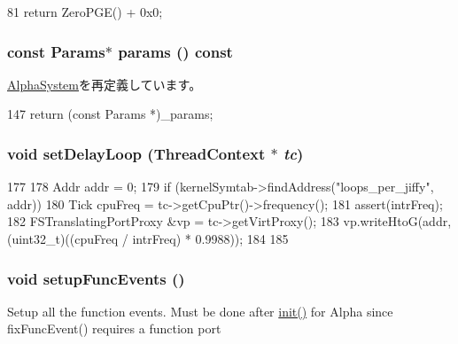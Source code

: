 \begin{DoxyCode}
81 { return ZeroPGE() + 0x0; }
\end{DoxyCode}
\hypertarget{classLinuxAlphaSystem_acd3c3feb78ae7a8f88fe0f110a718dff}{
\subsubsection[{params}]{\setlength{\rightskip}{0pt plus 5cm}const {\bf Params}$\ast$ params () const}}
\label{classLinuxAlphaSystem_acd3c3feb78ae7a8f88fe0f110a718dff}


\hyperlink{classAlphaSystem_acd3c3feb78ae7a8f88fe0f110a718dff}{AlphaSystem}を再定義しています。


\begin{DoxyCode}
147 { return (const Params *)_params; }
\end{DoxyCode}
\hypertarget{classLinuxAlphaSystem_a137cc9484ecf0bcc374fb7031b48d566}{
\subsubsection[{setDelayLoop}]{\setlength{\rightskip}{0pt plus 5cm}void setDelayLoop ({\bf ThreadContext} $\ast$ {\em tc})}}
\label{classLinuxAlphaSystem_a137cc9484ecf0bcc374fb7031b48d566}



\begin{DoxyCode}
177 {
178     Addr addr = 0;
179     if (kernelSymtab->findAddress("loops_per_jiffy", addr)) {
180         Tick cpuFreq = tc->getCpuPtr()->frequency();
181         assert(intrFreq);
182         FSTranslatingPortProxy &vp = tc->getVirtProxy();
183         vp.writeHtoG(addr, (uint32_t)((cpuFreq / intrFreq) * 0.9988));
184     }
185 }
\end{DoxyCode}
\hypertarget{classLinuxAlphaSystem_ae36115f702dd2f9ead5df8d632632cf7}{
\subsubsection[{setupFuncEvents}]{\setlength{\rightskip}{0pt plus 5cm}void setupFuncEvents ()}}
\label{classLinuxAlphaSystem_ae36115f702dd2f9ead5df8d632632cf7}
Setup all the function events. Must be done after \hyperlink{classSystem_a02fd73d861ef2e4aabb38c0c9ff82947}{init()} for Alpha since fixFuncEvent() requires a function port 

